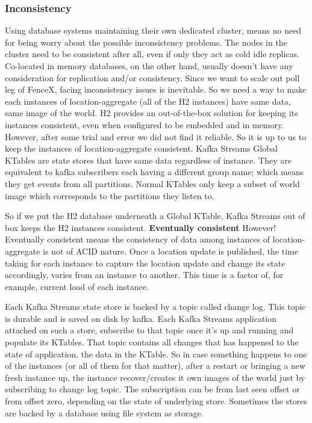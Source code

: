 \documentclass[a4]{report}
\begin{document}
        \subsubsection{Inconsistency}
        Using database systems maintaining their own dedicated cluster, means no need for being worry about the
        possible inconsistency problems.
        The nodes in the cluster need to be consistent after all, even if only they act as cold idle replicas.
        Co-located in memory databases, on the other hand, usually doesn't have any consideration for replication and/or
        consistency.
        Since we want to scale out poll leg of FenceX, facing inconsistency issues is inevitable.
        So we need a way to make each instances of location-aggregate (all of the H2 instances) have same data, same
        image of the world.
        H2 provides an out-of-the-box solution for keeping its instances consistent, even when configured to be embedded
        and in memory.
        However, after some trial and error we did not find it reliable.
        So it is up to us to keep the instances of location-aggregate consistent.
        Kafka Streams Global KTables are state stores that have same data regardless of instance.
        They are equivalent to kafka subscribers each having a different group name;
        which means they get events from all partitions.
        Normal KTables only keep a subset of world image which corresponds to the partitions they listen to.

        So if we put the H2 database underneath a Global KTable, Kafka Streams out of box keeps the H2 instances
        consistent.
        \textbf{Eventually consistent} However!
        Eventually consistent means the consistency of data among instances of location-aggregate is not of ACID nature.
        Once a location update is published, the time taking for each instance to capture the location update and change
        its state accordingly, varies from an instance to another.
        This time is a factor of, for example, current load of each instance.

        Each Kafka Streams state store is backed by a topic called change log.
        This topic is durable and is saved on disk by kafka.
        Each Kafka Streams application attached on such a store, subscribe to that topic once it's up and running and
        populate its KTables.
        That topic contains all changes that has happened to the state of application, the data in the KTable.
        So in case something happens to one of the instances (or all of them for that matter), after a restart or bringing
        a new fresh instance up, the instance recover/creates it own images of the world just by subscribing to change
        log topic.
        The subscription can be from last seen offset or from offset zero, depending on the state of underlying store.
        Sometimes the stores are backed by a database using file system as storage.
\end{document}
